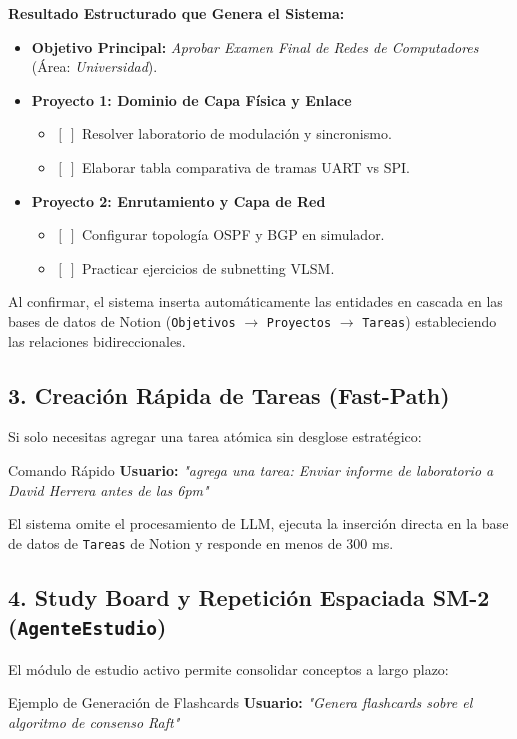 \documentclass[11pt,a4paper]{article}
\begin{document}
\textbf{Resultado Estructurado que Genera el Sistema:}
\begin{itemize}
    \item \textbf{Objetivo Principal:} \textit{Aprobar Examen Final de Redes de Computadores} (Área: \textit{Universidad}).
    \item \textbf{Proyecto 1: Dominio de Capa Física y Enlace}
    \begin{itemize}
        \item $[~]$ Resolver laboratorio de modulación y sincronismo.
        \item $[~]$ Elaborar tabla comparativa de tramas UART vs SPI.
    \end{itemize}
    \item \textbf{Proyecto 2: Enrutamiento y Capa de Red}
    \begin{itemize}
        \item $[~]$ Configurar topología OSPF y BGP en simulador.
        \item $[~]$ Practicar ejercicios de subnetting VLSM.
    \end{itemize}
\end{itemize}

Al confirmar, el sistema inserta automáticamente las entidades en cascada en las bases de datos de Notion (\texttt{Objetivos} $\rightarrow$ \texttt{Proyectos} $\rightarrow$ \texttt{Tareas}) estableciendo las relaciones bidireccionales.

\subsection{3. Creación Rápida de Tareas (Fast-Path)}
Si solo necesitas agregar una tarea atómica sin desglose estratégico:
\begin{infobox}{Comando Rápido}
\textbf{Usuario:} \textit{"agrega una tarea: Enviar informe de laboratorio a David Herrera antes de las 6pm"}
\end{infobox}
El sistema omite el procesamiento de LLM, ejecuta la inserción directa en la base de datos de \texttt{Tareas} de Notion y responde en menos de 300 ms.

\subsection{4. Study Board y Repetición Espaciada SM-2 (\texttt{AgenteEstudio})}
El módulo de estudio activo permite consolidar conceptos a largo plazo:

\begin{infobox}{Ejemplo de Generación de Flashcards}
\textbf{Usuario:} \textit{"Genera flashcards sobre el algoritmo de consenso Raft"}
\end{infobox}
\end{document}
